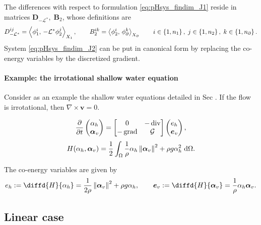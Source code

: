 The differences with respect to formulation \eqref{eq:pHsys_findim_J1} reside in matrices $\mathbf{D}_{-\mathcal{L}^*}, \; \mathbf{B}_2$, whose definitions are
\begin{equation}
{D}_{-\mathcal{L}^*}^{ij} = \inner[X_1]{\phi_1^i}{\mathcal{-L^*}\phi_2^j}, \qquad B_2^{ik} = \inner[X_\partial]{\phi_2^i}{\phi_{\partial}^k} \qquad i \in \left\{1, n_1\right\}, \; j \in \left\{1, n_2\right\},\; k \in \left\{1, n_\partial \right\}.
\end{equation}
System \eqref{eq:pHsys_findim_J2} can be put in canonical form by replacing the co-energy variables by the discretized gradient.

\paragraph{Example: the irrotational shallow water equation}
Consider as an example the shallow water equations detailed in Sec . If the flow is irrotational, then $\nabla \times \bm{v} = 0$.

\begin{equation}
\diffp{}{t}
\begin{pmatrix}
\alpha_h \\
\bm{\alpha}_v \\
\end{pmatrix} = 
\begin{bmatrix}
0 & -\div \\
-\grad & \mathcal{G}
\end{bmatrix}
\begin{pmatrix}
e_h \\
\bm{e}_v \\
\end{pmatrix},
\end{equation} 
\begin{equation*}
H(\alpha_h, \bm{\alpha}_v) = \frac{1}{2} \int_\Omega \frac{1}{\rho} \alpha_h \norm{\bm{\alpha}_v}^2 + \rho g \alpha_h^2 \d\Omega.
\end{equation*}

The co-energy variables are given by
\begin{equation*}
e_h := \diffd{H}{\alpha_h} = \frac{1}{2 \rho} \norm{\bm{\alpha}_v}^2 + \rho g \alpha_h, \qquad \bm{e}_v := \diffd{H}{\bm{\alpha}_v} = \frac{1}{\rho} \alpha_h \bm{\alpha}_v.
\end{equation*}
\subsection{Linear case}


